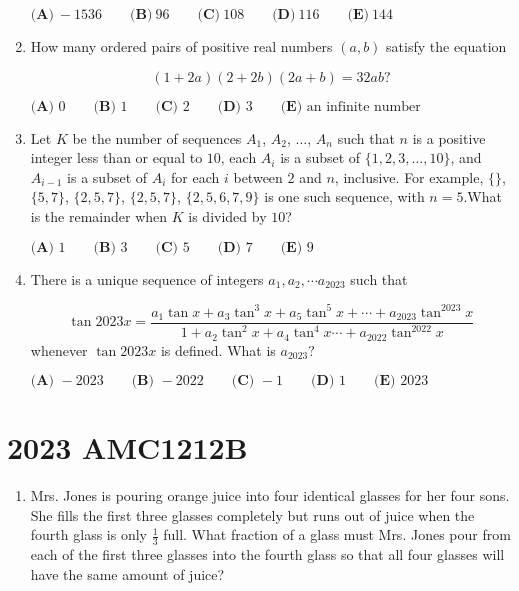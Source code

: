 \documentclass{article}
\begin{document}
\begin{enumerate}[label=\arabic*., itemsep=0.5em]
\(\textbf{(A)}~-1536\qquad\textbf{(B)}~96\qquad\textbf{(C)}~108\qquad\textbf{(D)}~116\qquad\textbf{(E)}~144\)\par \vspace{0.5em}\item How many ordered pairs of positive real numbers \((a,b)\) satisfy the equation

\begin{equation*}
(1+2a)(2+2b)(2a+b) = 32ab?
\end{equation*}


\(\textbf{(A) }0\qquad\textbf{(B) }1\qquad\textbf{(C) }2\qquad\textbf{(D) }3\qquad\textbf{(E) }\text{an infinite number}\)\par \vspace{0.5em}\item Let \(K\) be the number of sequences \(A_1\), \(A_2\), \(\dots\), \(A_n\) such that \(n\) is a positive integer less than or equal to \(10\), each \(A_i\) is a subset of \(\{1, 2, 3, \dots, 10\}\), and \(A_{i-1}\) is a subset of \(A_i\) for each \(i\) between \(2\) and \(n\), inclusive. For example, \(\{\}\), \(\{5, 7\}\), \(\{2, 5, 7\}\), \(\{2, 5, 7\}\), \(\{2, 5, 6, 7, 9\}\) is one such sequence, with \(n = 5\).What is the remainder when \(K\) is divided by \(10\)?

\(\textbf{(A) } 1 \qquad \textbf{(B) } 3 \qquad \textbf{(C) } 5 \qquad \textbf{(D) } 7 \qquad \textbf{(E) } 9\)\par \vspace{0.5em}\item There is a unique sequence of integers \(a_1, a_2, \cdots a_{2023}\) such that

\begin{equation*}
\tan2023x = \frac{a_1 \tan x + a_3 \tan^3 x + a_5 \tan^5 x + \cdots + a_{2023} \tan^{2023} x}{1 + a_2 \tan^2 x + a_4 \tan^4 x \cdots + a_{2022} \tan^{2022} x}
\end{equation*}
whenever \(\tan 2023x\) is defined. What is \(a_{2023}?\)

\(\textbf{(A) } -2023 \qquad\textbf{(B) } -2022 \qquad\textbf{(C) } -1 \qquad\textbf{(D) } 1 \qquad\textbf{(E) } 2023\)\par \vspace{0.5em}\end{enumerate}\newpage\section*{2023 AMC1212B}\begin{enumerate}[label=\arabic*., itemsep=0.5em]\item Mrs. Jones is pouring orange juice into four identical glasses for her four sons. She fills the first three glasses completely but runs out of juice when the fourth glass is only \(\frac{1}{3}\) full. What fraction of a glass must Mrs. Jones pour from each of the first three glasses into the fourth glass so that all four glasses will have the same amount of juice?


\end{enumerate}
\end{document}
